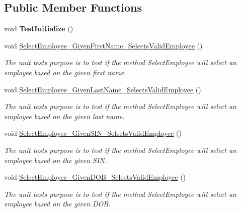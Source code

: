 \subsection*{Public Member Functions}
\begin{DoxyCompactItemize}
\item 
\hypertarget{class_the_company_1_1_tests_1_1_select_employee_tests_aaf57ab8b20b6700bdc40df566403f2d8}{}void {\bfseries Test\+Initialize} ()\label{class_the_company_1_1_tests_1_1_select_employee_tests_aaf57ab8b20b6700bdc40df566403f2d8}

\item 
void \hyperlink{class_the_company_1_1_tests_1_1_select_employee_tests_a38c1eac0c3624594996fdf67aecdfb12}{Select\+Employee\+\_\+\+Given\+First\+Name\+\_\+\+Selects\+Valid\+Employee} ()
\begin{DoxyCompactList}\small\item\em The unit test\textquotesingle{}s purpose is to test if the method Select\+Employee will select an employee based on the given first name. \end{DoxyCompactList}\item 
void \hyperlink{class_the_company_1_1_tests_1_1_select_employee_tests_ac5e0ec8e7078c8154ff540dbc86453b9}{Select\+Employee\+\_\+\+Given\+Last\+Name\+\_\+\+Selects\+Valid\+Employee} ()
\begin{DoxyCompactList}\small\item\em The unit test\textquotesingle{}s purpose is to test if the method Select\+Employee will select an employee based on the given last name. \end{DoxyCompactList}\item 
void \hyperlink{class_the_company_1_1_tests_1_1_select_employee_tests_a290304e6a0ba6dc2f6da8fcb21c7e266}{Select\+Employee\+\_\+\+Given\+S\+I\+N\+\_\+\+Selects\+Valid\+Employee} ()
\begin{DoxyCompactList}\small\item\em The unit test\textquotesingle{}s purpose is to test if the method Select\+Employee will select an employee based on the given S\+I\+N. \end{DoxyCompactList}\item 
void \hyperlink{class_the_company_1_1_tests_1_1_select_employee_tests_a35d79f2d4172fce929c0a3e41cd24e50}{Select\+Employee\+\_\+\+Given\+D\+O\+B\+\_\+\+Selects\+Valid\+Employee} ()
\begin{DoxyCompactList}\small\item\em The unit test\textquotesingle{}s purpose is to test if the method Select\+Employee will select an employee based on the given D\+O\+B. \end{DoxyCompactList}\item 

\end{DoxyCompactItemize}
